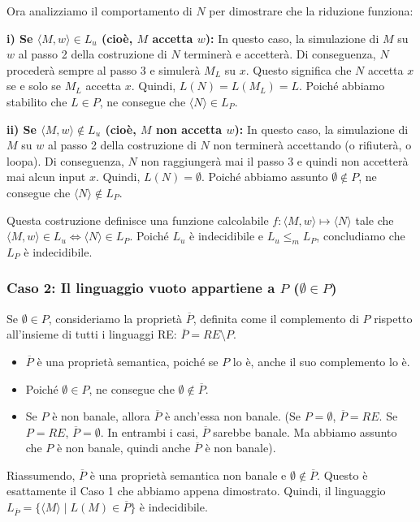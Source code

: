 \documentclass[a4paper, 11pt]{book} %
\theoremstyle{definition}
\begin{document}
Ora analizziamo il comportamento di $N$ per dimostrare che la riduzione funziona:

\textbf{i) Se $\langle M,w \rangle \in L_u$ (cioè, $M$ accetta $w$):}
In questo caso, la simulazione di $M$ su $w$ al passo 2 della costruzione di $N$ terminerà e accetterà. Di conseguenza, $N$ procederà sempre al passo 3 e simulerà $M_L$ su $x$. Questo significa che $N$ accetta $x$ se e solo se $M_L$ accetta $x$.
Quindi, $L(N) = L(M_L) = L$.
Poiché abbiamo stabilito che $L \in P$, ne consegue che $\langle N \rangle \in L_P$.

\textbf{ii) Se $\langle M,w \rangle \notin L_u$ (cioè, $M$ non accetta $w$):}
In questo caso, la simulazione di $M$ su $w$ al passo 2 della costruzione di $N$ non terminerà accettando (o rifiuterà, o loopa). Di conseguenza, $N$ non raggiungerà mai il passo 3 e quindi non accetterà mai alcun input $x$.
Quindi, $L(N) = \emptyset$.
Poiché abbiamo assunto $\emptyset \notin P$, ne consegue che $\langle N \rangle \notin L_P$.

Questa costruzione definisce una funzione calcolabile $f: \langle M,w \rangle \mapsto \langle N \rangle$ tale che $\langle M,w \rangle \in L_u \iff \langle N \rangle \in L_P$. Poiché $L_u$ è indecidibile e $L_u \le_m L_P$, concludiamo che $L_P$ è indecidibile.

\subsubsection{Caso 2: Il linguaggio vuoto appartiene a $P$ ($\emptyset \in P$)}
Se $\emptyset \in P$, consideriamo la proprietà $\overline{P}$, definita come il complemento di $P$ rispetto all'insieme di tutti i linguaggi RE: $\overline{P} = RE \setminus P$.
\begin{itemize}
    \item $\overline{P}$ è una proprietà semantica, poiché se $P$ lo è, anche il suo complemento lo è.
    \item Poiché $\emptyset \in P$, ne consegue che $\emptyset \notin \overline{P}$.
    \item Se $P$ è non banale, allora $\overline{P}$ è anch'essa non banale. (Se $P = \emptyset$, $\overline{P} = RE$. Se $P = RE$, $\overline{P} = \emptyset$. In entrambi i casi, $\overline{P}$ sarebbe banale. Ma abbiamo assunto che $P$ è non banale, quindi anche $\overline{P}$ è non banale).
\end{itemize}
Riassumendo, $\overline{P}$ è una proprietà semantica non banale e $\emptyset \notin \overline{P}$. Questo è esattamente il Caso 1 che abbiamo appena dimostrato. Quindi, il linguaggio $L_{\overline{P}} = \{\langle M \rangle \mid L(M) \in \overline{P}\}$ è indecidibile.
\end{document}
